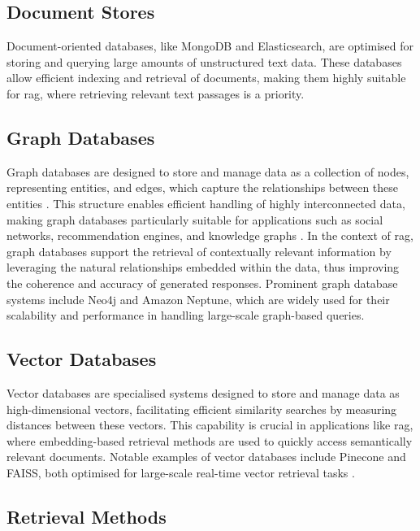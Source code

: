 \subsection{Document Stores}\label{sec:document-stores}
Document-oriented databases, like MongoDB and Elasticsearch, are optimised for storing and querying large amounts of unstructured text data. 
These databases allow efficient indexing and retrieval of documents, making them highly suitable for \ac{rag}, where retrieving relevant text passages is a priority.
\subsection{Graph Databases}\label{sec:graph-databases}
Graph databases are designed to store and manage data as a collection of nodes, representing entities, and edges, which capture the relationships between these entities \citep{Robinson2015}. This structure enables efficient handling of highly interconnected data, making graph databases particularly suitable for applications such as social networks, recommendation engines, and knowledge graphs \citep{Angles2008}. In the context of \ac{rag}, graph databases support the retrieval of contextually relevant information by leveraging the natural relationships embedded within the data, thus improving the coherence and accuracy of generated responses. Prominent graph database systems include Neo4j and Amazon Neptune, which are widely used for their scalability and performance in handling large-scale graph-based queries.

\subsection{Vector Databases}\label{sec:vector-databases}
Vector databases are specialised systems designed to store and manage data as high-dimensional vectors, facilitating efficient similarity searches by measuring distances between these vectors. 
This capability is crucial in applications like \ac{rag}, where embedding-based retrieval methods are used to quickly access semantically relevant documents. 
Notable examples of vector databases include Pinecone and FAISS, both optimised for large-scale real-time vector retrieval tasks \citep{Johnson2019}.

\subsection{Retrieval Methods}\label{sec:retrieval-methods}

